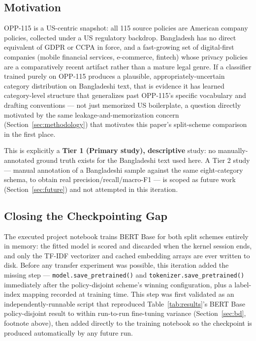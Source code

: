 \documentclass[11pt]{article}
\begin{document}
\subsection{Motivation}

OPP-115 is a US-centric snapshot: all 115 source policies are American company policies, collected under a US regulatory backdrop. Bangladesh has no direct equivalent of GDPR or CCPA in force, and a fast-growing set of digital-first companies (mobile financial services, e-commerce, fintech) whose privacy policies are a comparatively recent artifact rather than a mature legal genre. If a classifier trained purely on OPP-115 produces a plausible, appropriately-uncertain category distribution on Bangladeshi text, that is evidence it has learned category-level structure that generalizes past OPP-115's specific vocabulary and drafting conventions --- not just memorized US boilerplate, a question directly motivated by the same leakage-and-memorization concern (Section~\ref{sec:methodology}) that motivates this paper's split-scheme comparison in the first place.

This is explicitly a \textbf{Tier 1 (Primary study), descriptive} study: no manually-annotated ground truth exists for the Bangladeshi text used here. A Tier 2 study --- manual annotation of a Bangladeshi sample against the same eight-category schema, to obtain real precision/recall/macro-F1 --- is scoped as future work (Section~\ref{sec:future}) and not attempted in this iteration.

\subsection{Closing the Checkpointing Gap}

The executed project notebook trains BERT Base for both split schemes entirely in memory: the fitted model is scored and discarded when the kernel session ends, and only the TF-IDF vectorizer and cached embedding arrays are ever written to disk. Before any transfer experiment was possible, this iteration added the missing step --- \texttt{model.save\_pretrained()} and \texttt{tokenizer.save\_pretrained()} immediately after the policy-disjoint scheme's winning configuration, plus a label-index mapping recorded at training time. This step was first validated as an independently-runnable script that reproduced Table~\ref{tab:results}'s BERT Base policy-disjoint result to within run-to-run fine-tuning variance (Section~\ref{sec:bd}, footnote above), then added directly to the training notebook so the checkpoint is produced automatically by any future run.
\end{document}
